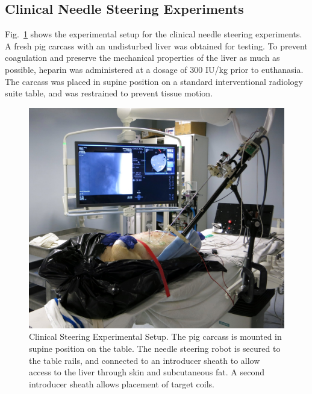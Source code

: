 \subsection{Clinical Needle Steering Experiments}
Fig.~\ref{fig:CadaverSetup} shows the experimental setup for the clinical needle steering experiments. A fresh pig carcass with an undisturbed liver was obtained for testing. To prevent coagulation and preserve the mechanical properties of the liver as much as possible, heparin was administered at a dosage of 300 IU/kg prior to euthanasia. The carcass was placed in supine position on a standard interventional radiology suite table, and was restrained to prevent tissue motion. 

\begin{figure}[!t]
\centering
\includegraphics[width = \columnwidth]{./Images/Chapter5/CadaverSetup/CadaverSetup.jpg}%
\caption[Clinical Needle Steering Experimental Setup]{Clinical Steering Experimental Setup. The pig carcass is mounted in supine position on the table. The needle steering robot is secured to the table rails, and connected to an introducer sheath to allow access to the liver through skin and subcutaneous fat. A second introducer sheath allows placement of target coils.}
\label{fig:CadaverSetup}
\end{figure}  

